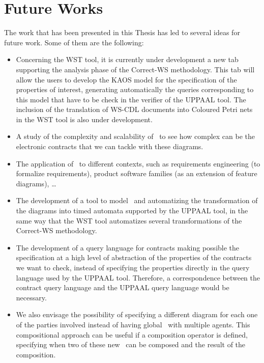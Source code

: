 \section{Future Works}\label{future}

The work that has been presented in this Thesis has led to several ideas for future work. Some of them are the following:

\begin{itemize}

\item Concerning the WST tool, it is currently under development a new tab supporting the analysis phase of the Correct-WS methodology. This tab will allow the users to develop the KAOS model for the specification of the properties of interest, generating automatically the queries corresponding to this model that have to be check in the verifier of the UPPAAL tool. The inclusion of the translation of WS-CDL documents into Coloured Petri nets in the WST tool is also under development.

\item A study of the complexity and scalability of \codiag\ to see how complex can be the electronic contracts that we can tackle with these diagrams.

\item The application of \codiag\ to different contexts, such as requirements engineering (to formalize
requirements), product software families (as an extension of feature diagrams), \ldots

\item The development of a tool to model \codiag\ and automatizing the transformation of the diagrams into timed automata supported by the UPPAAL tool, in the same way that the WST tool automatizes several transformations of the Correct-WS methodology.

\item The development of a query language for contracts making possible the specification at a high level of abstraction of the properties of the contracts we want to check, instead of specifying the properties directly in the query language used by the UPPAAL tool. Therefore, a correspondence between the contract query language and the UPPAAL query language would be necessary.

\item We also envisage the possibility of specifying a different diagram for each one of the parties involved instead of having global \codiag\ with multiple agents. This compositional approach can be useful if a composition operator is defined, specifying when two of these new \codiag\ can be composed and the result of the composition.

\end{itemize}

